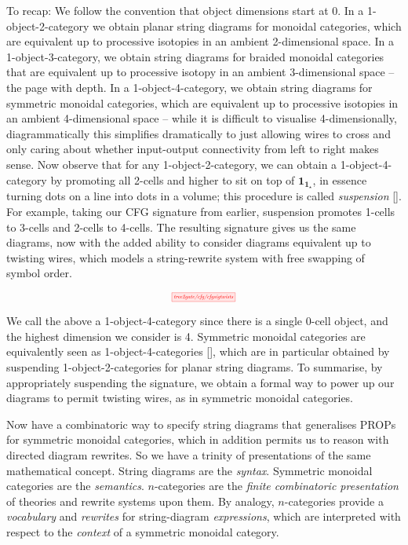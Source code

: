 To recap: We follow the convention that object dimensions start at 0. In a 1-object-2-category we obtain planar string diagrams for monoidal categories, which are equivalent up to processive isotopies in an ambient 2-dimensional space. In a 1-object-3-category, we obtain string diagrams for braided monoidal categories that are equivalent up to processive isotopy in an ambient 3-dimensional space -- the page with depth. In a 1-object-4-category, we obtain string diagrams for symmetric monoidal categories, which are equivalent up to processive isotopies in an ambient 4-dimensional space -- while it is difficult to visualise 4-dimensionally, diagrammatically this simplifies dramatically to just allowing wires to cross and only caring about whether input-output connectivity from left to right makes sense. Now observe that for any 1-object-2-category, we can obtain a 1-object-4-category by promoting all 2-cells and higher to sit on top of $\textbf{1}_{\textbf{1}_\star}$, in essence turning dots on a line into dots in a volume; this procedure is called \emph{suspension} []. For example, taking our CFG signature from earlier, suspension promotes 1-cells to 3-cells and 2-cells to 4-cells. The resulting signature gives us the same diagrams, now with the added ability to consider diagrams equivalent up to twisting wires, which models a string-rewrite system with free swapping of symbol order.

\[\scalebox{0.5}{\tikzfig{tree2gate/cfg/cfgsigtwists}}\]

We call the above a 1-object-4-category since there is a single 0-cell object, and the highest dimension we consider is 4. Symmetric monoidal categories are equivalently seen as 1-object-4-categories [], which are in particular obtained by suspending 1-object-2-categories for planar string diagrams. To summarise, by appropriately suspending the signature, we obtain a formal way to power up our diagrams to permit twisting wires, as in symmetric monoidal categories.\\

\begin{remark}
Now have a combinatoric way to specify string diagrams that generalises PROPs for symmetric monoidal categories, which in addition permits us to reason with directed diagram rewrites. So we have a trinity of presentations of the same mathematical concept. String diagrams are the \emph{syntax}. Symmetric monoidal categories are the \emph{semantics}. $n$-categories are the \emph{finite combinatoric presentation} of theories and rewrite systems upon them. By analogy, $n$-categories provide a \emph{vocabulary} and \emph{rewrites} for string-diagram \emph{expressions}, which are interpreted with respect to the \emph{context} of a symmetric monoidal category.
\end{remark}

